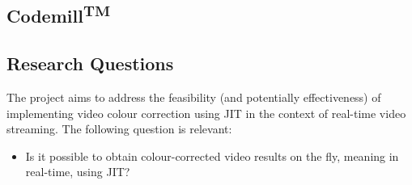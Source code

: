 \documentclass[12pt,a4paper]{article}
\begin{document}










\subsection{Codemill\textsuperscript{TM}} 









\subsection{Research Questions}

The project aims to address the feasibility (and potentially effectiveness) of implementing video colour correction using JIT in the context of real-time video streaming. The following question is relevant:

\begin{itemize}
	\item Is it possible to obtain colour-corrected video results on the fly, meaning in real-time, using JIT?
\end{itemize}
\end{document}
